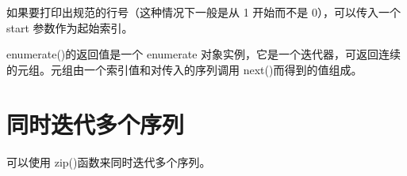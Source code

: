如果要打印出规范的行号（这种情况下一般是从 1 开始而不是 0），可以传入一个 start 参数作为起始索引。

enumerate()的返回值是一个 enumerate 对象实例，它是一个迭代器，可返回连续的元组。元组由一个索引值和对传入的序列调用 next()而得到的值组成。
\section{同时迭代多个序列}
可以使用 zip()函数来同时迭代多个序列。
\section{}
\section{}
\section{}
\section{}
\section{}